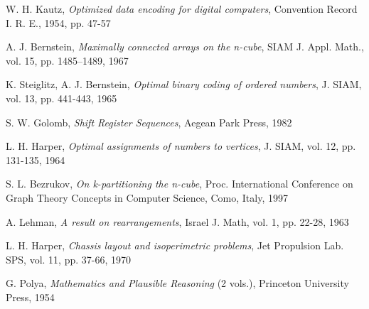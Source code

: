 \documentclass[12pt, a4paper]{article}
\begin{document}
\begin{thebibliography}{9}
\label{Bibliography}

	W. H. Kautz,
	\emph{Optimized data encoding for digital computers},
	Convention Record I. R. E., 1954, pp. 47-57

	A. J. Bernstein,
	\emph{Maximally connected arrays on the n-cube},
	SIAM J. Appl. Math., vol. 15, pp. 1485–1489, 1967

	K. Steiglitz, A. J. Bernstein,
	\emph{Optimal binary coding of ordered numbers},
	J. SIAM, vol. 13, pp. 441-443, 1965

	S. W. Golomb,
	\emph{Shift Register Sequences},
	Aegean Park Press, 1982

	L. H. Harper,
	\emph{Optimal assignments of numbers to vertices},
	J. SIAM, vol. 12, pp. 131-135, 1964

	S. L. Bezrukov,
	\emph{On k-partitioning the n-cube},
	Proc. International Conference on Graph Theory Concepts in Computer Science,
	Como, Italy, 1997

	A. Lehman,
	\emph{A result on rearrangements},
	Israel J. Math, vol. 1, pp. 22-28, 1963

	L. H. Harper,
	\emph{Chassis layout and isoperimetric problems},
	Jet Propulsion Lab. SPS, vol. 11, pp. 37-66, 1970

	G. Polya,
	\emph{Mathematics and Plausible Reasoning} (2 vols.),
	Princeton University Press, 1954

\end{thebibliography}
\end{document}
